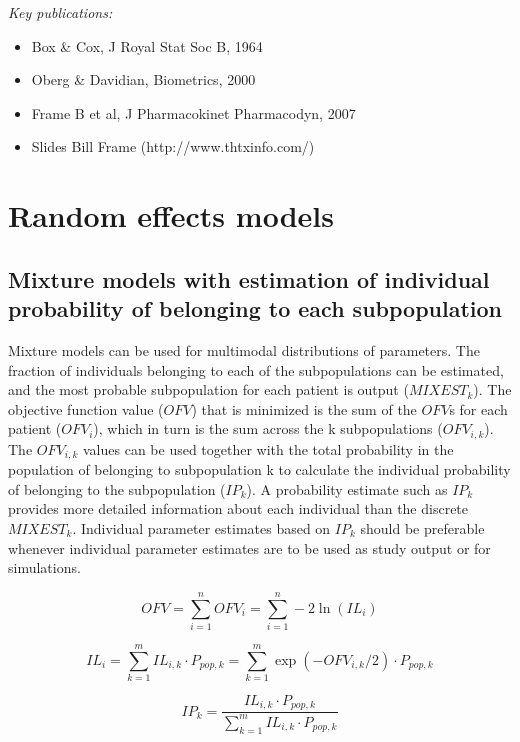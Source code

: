 \documentclass[a4paper,11pt]{article}
\begin{document}
\noindent \emph{Key publications:}
\begin{itemize}
\item Box \& Cox, J Royal Stat Soc B, 1964
\item Oberg \& Davidian, Biometrics, 2000
\item Frame B et al, J Pharmacokinet Pharmacodyn, 2007
\item Slides Bill Frame (http://www.thtxinfo.com/)
\end{itemize}


\section{Random effects models}

\subsection{Mixture models with estimation of individual probability of belonging to each subpopulation}
Mixture models can be used for multimodal distributions of
parameters. The fraction of individuals belonging to each of the
subpopulations can be estimated, and the most probable subpopulation
for each patient is output ($MIXEST_k$). The objective function value
($OFV$) that is minimized is the sum of the $OFV$s for each patient
($OFV_i$), which in turn is the sum across the k subpopulations
($OFV_{i,k}$). The $OFV_{i,k}$ values can be used together with the
total probability in the population of belonging to subpopulation k to
calculate the individual probability of belonging to the subpopulation
($IP_k$). A probability estimate such as $IP_k$ provides more detailed
information about each individual than the discrete
$MIXEST_k$. Individual parameter estimates based on $IP_k$ should be
preferable whenever individual parameter estimates are to be used as
study output or for simulations.

\begin{equation}
OFV = \displaystyle\sum\limits_{i=1}^n OFV_i = \displaystyle\sum\limits_{i=1}^n -2 \ln(IL_i)
\end{equation}

\begin{equation}
IL_i = \displaystyle\sum\limits_{k=1}^m IL_{i,k} \cdot P_{pop,k} = \displaystyle\sum\limits_{k=1}^m \exp(-OFV_{i,k} / 2) \cdot P_{pop,k}
\end{equation}

\begin{equation}
IP_k = \frac{IL_{i,k} \cdot P_{pop,k}}{\displaystyle\sum\limits_{k=1}^m IL_{i,k} \cdot P_{pop,k}}
\end{equation}
\end{document}
